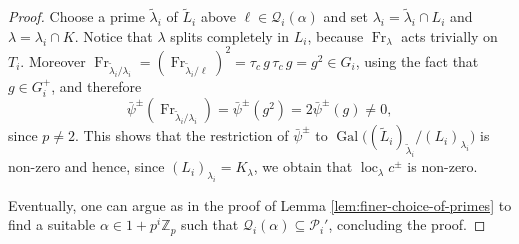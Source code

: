 \documentclass[12pt,reqno]{amsart}
\theoremstyle{definition}
\theoremstyle{remark}
\newcommand{\numberset}{\mathbb}
\newcommand{\Z}{\numberset{Z}}
\DeclareMathOperator{\Gal}{Gal}
\DeclareMathOperator{\Frac}{Frac}
\DeclareMathOperator{\loc}{loc}
\DeclareMathOperator{\Fr}{Fr}
\newcommand{\ga}{\alpha}
\newcommand{\gl}{\lambda}
\begin{document}
\begin{proof}
   Choose a prime $\tilde{\gl}_i$ of $\tilde{L}_i$ above $\ell\in \mathcal{Q}_i(\ga)$ and set $\gl_i=\tilde{\gl}_i\cap L_i$ and $\gl=\gl_i\cap K$. Notice that $\gl$ splits completely in $L_i$, because $\Fr_{\lambda}$ acts trivially on $T_i$. Moreover $\Fr_{\tilde{\gl}_i/\gl_i}=(\Fr_{\tilde{\gl}_i/\ell})^2=\tau_c \, g\,\tau_c\, g=g^2\in G_i$, using the fact that $g\in G_i^+$, and therefore
    \begin{equation*}
        \bar{\psi}^{\pm}(\Fr_{\tilde{\gl}_i/\gl_i})
        =\bar{\psi}^{\pm}(g^2)=2\bar{\psi}^{\pm}(g)\ne 0,
    \end{equation*}
    since $p\ne 2$. This shows that the restriction of $\bar{\psi}^{\pm}$ to $\Gal\big((\tilde{L}_i)_{\tilde{\gl}_i}/(L_i)_{\gl_i}\big)$ is non-zero and hence, since $(L_i)_{\gl_i}=K_\gl$, we obtain that $\loc_\gl c^{\pm}$ is non-zero.

   Eventually, one can argue as in the proof of Lemma \ref{lem:finer-choice-of-primes} to find a suitable $\ga\in 1+p^i\Z_p$ such that $\mathcal{Q}_i(\ga)\subseteq \mathcal{P}_i'$, concluding the proof.
\end{proof}















\end{document}
